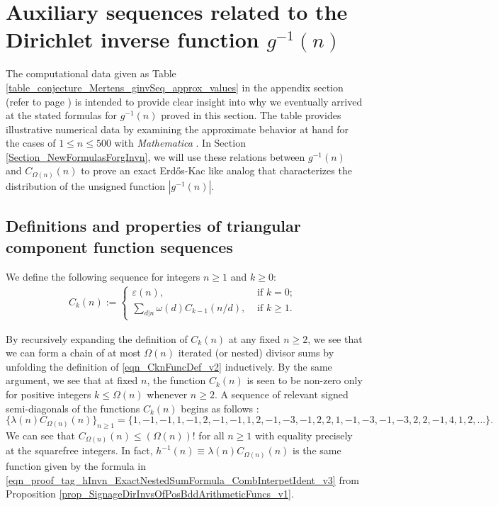 \documentclass[11pt,reqno,a4letter]{article}
\numberwithin{figure}{section}
\numberwithin{table}{section}
\newcommand{\seqnum}[1]{\href{http://oeis.org/#1}{\color{ProcessBlue}{\underline{#1}}}}
\theoremstyle{plain}
\numberwithin{theorem}{section}
\theoremstyle{definition}
\begin{document}
\newpage
\section{Auxiliary sequences related to the Dirichlet inverse function $g^{-1}(n)$} 
\label{Section_InvFunc_PreciseExpsAndAsymptotics} 

The computational data given as Table \ref{table_conjecture_Mertens_ginvSeq_approx_values} 
in the appendix section (refer to 
page \pageref{table_conjecture_Mertens_ginvSeq_approx_values}) is intended to 
provide clear insight into why we eventually arrived at the stated formulas for  
$g^{-1}(n)$ proved in this section. The table provides illustrative 
numerical data by examining the approximate behavior 
at hand for the cases of $1 \leq n \leq 500$ with \emph{Mathematica} 
\cite{SCHMIDT-MERTENS-COMPUTATIONS}. 
In Section \ref{Section_NewFormulasForgInvn}, 
we will use these relations between $g^{-1}(n)$ and 
$C_{\Omega(n)}(n)$ to prove an exact Erd\H{o}s-Kac like analog that characterizes 
the distribution of the unsigned function $|g^{-1}(n)|$. 

\subsection{Definitions and properties of triangular component function sequences} 

We define the following sequence for integers $n \geq 1$ and $k \geq 0$: 
\begin{align} 
\label{eqn_CknFuncDef_v2} 
C_k(n) := \begin{cases} 
     \varepsilon(n), & \text{ if $k = 0$; } \\ 
     \sum\limits_{d|n} \omega(d) C_{k-1}(n/d), & \text{ if $k \geq 1$. } 
     \end{cases} 
\end{align} 

By recursively expanding the definition of $C_k(n)$ 
at any fixed $n \geq 2$, we see that 
we can form a chain of at most $\Omega(n)$ iterated (or nested) divisor sums by 
unfolding the definition of \eqref{eqn_CknFuncDef_v2} inductively. 
By the same argument, we see that at fixed $n$, the function 
$C_k(n)$ is seen to be non-zero only for positive integers 
$k \leq \Omega(n)$ whenever $n \geq 2$. 
A sequence of relevant signed semi-diagonals of the functions $C_k(n)$ begins as follows 
\cite[\seqnum{A008480}]{OEIS}: 
\[
\{\lambda(n) C_{\Omega(n)}(n) \}_{n \geq 1} = \{
     1, -1, -1, 1, -1, 2, -1, -1, 1, 2, -1, -3, -1, 2, 2, 1, -1, -3, -1, 
     -3, 2, 2, -1, 4, 1, 2, \ldots \}. 
\]
We can see that $C_{\Omega(n)}(n) \leq (\Omega(n))!$ for all $n \geq 1$ with equality precisely at the 
squarefree integers. In fact, 
$h^{-1}(n) \equiv \lambda(n) C_{\Omega(n)}(n)$ is the same function given by 
the formula in \eqref{eqn_proof_tag_hInvn_ExactNestedSumFormula_CombInterpetIdent_v3} from 
Proposition \ref{prop_SignageDirInvsOfPosBddArithmeticFuncs_v1}. 
\end{document}
